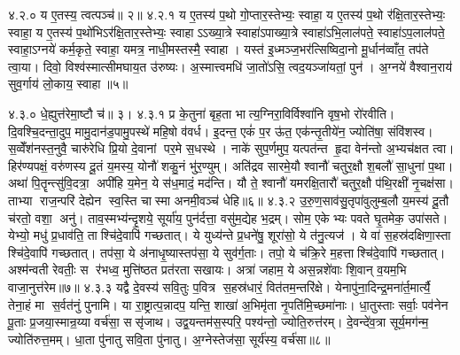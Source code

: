 ४.२.०
य ए॒तस्य॒ त्वत्पञ्च॑॥ २॥
४.२.१
य ए॒तस्य॑ प॒थो गो॒प्तार॒स्तेभ्यः॒ स्वाहा॒ य ए॒तस्य॑ प॒थो र॑क्षि॒तार॒स्तेभ्यः॒ स्वाहा॒ य ए॒तस्य॑ प॒थो॑भिऽर॑क्षि॒तार॒स्तेभ्यः॒ स्वाहाऽऽख्या॒त्रे स्वाहा॑ऽपाख्या॒त्रे स्वाहा॑ऽभि॒लाल॑पते॒ स्वाहा॑ऽप॒लाल॑पते॒ स्वाहा॒ऽग्नये॑ कर्म॒कृते॒ स्वाहा॒ यमत्र॒ नाधी॒मस्तस्मै॒ स्वाहा। यस्त॑ इ॒ध्मञ्ज॒भर॑त्सिष्विदा॒नो मू॒र्धान॑व्वाँत॒ तप॑ते त्वा॒या। दिवो॒ विश्व॑स्मात्सीमघाय॒त उ॑रुष्यः। अ॒स्मात्त्वमधि॑ जा॒तो॑ऽसि॒ त्वद॒यञ्जा॑यतां॒ पुन॑। अ॒ग्नये॑ वैश्वान॒राय॑ सुव॒र्गाय॑ लो॒काय॒ स्वाहा॥५॥
\anuvakamend

४.३.०
धे॒ह्युत्त॑रेमा॒ष्टौ च॑॥ ३।
४.३.१
प्र के॒तुना॑ बृह॒ता भात्य॒ग्निरा॒विर्विश्वा॑नि वृष॒भो रो॑रवीति। दि॒वश्चि॒दन्ता॒दुप॒ मामु॒दान॑ड॒पामु॒पस्थे॑ महि॒षो व॑वर्ध। इ॒दन्त॒ एकं॑ प॒र ऊ॑त॒ एक॑न्तृ॒तीये॑न॒ ज्योति॑षा॒ संवि॑शस्व। स॒व्वेँश॑नस्त॒नुवै॒ चारु॑रेधि प्रि॒यो दे॒वानां पर॒मे स॒धस्थे। नाके॑ सुप॒र्णमुप॒ यत्पत॑न्त हृ॒दा वेन॑न्तो अ॒भ्यच॑क्षत त्वा। हिर॑ण्यपक्षं॒ वरु॑णस्य दू॒तं य॒मस्य॒ योनौ॑ शकु॒नं भु॑र॒ण्युम्। अति॑द्रव सारमे॒यौ श्वानौ॑ चतुर॒क्षौ श॒बलौ॑ सा॒धुना॑ प॒था। अथा॑ पि॒तॄन्त्सु॑वि॒दत्रा॒ अपी॑हि य॒मेन॒ ये स॑ध॒मादं॒ मद॑न्ति। यौ ते॒ श्वानौ॑ यमरक्षि॒तारौ॑ चतुर॒क्षौ प॑थि॒रक्षी॑ नृ॒चक्ष॑सा। ताभ्या राज॒न्परि॑ देह्येन स्व॒स्ति चास्मा अनमी॒वञ्च॑ धेहि॥६॥
४.३.२
उ॒रु॒ण॒साव॑सु॒तृपा॑वुलुम्ब॒लौ य॒मस्य॑ दू॒तौ च॑रतो॒ वशा॒ अनु॑। ताव॒स्मभ्य॑न्दृ॒शये॒ सूर्या॑य॒ पुन॑र्दत्ता॒ वसु॑म॒द्येह भ॒द्रम्। सोम॒ एकेभ्यः पवते घृ॒तमेक॒ उपा॑सते। येभ्यो॒ मधु॑ प्र॒धाव॑ति॒ ताश्चि॑दे॒वापि॑ गच्छतात्। ये युध्य॑न्ते प्र॒धने॑षु॒ शूरा॑सो॒ ये त॑नु॒त्यज॑। ये वा॑ स॒हस्र॑दक्षिणा॒स्ता श्चि॑दे॒वापि॑ गच्छतात्। तप॑सा॒ ये अ॑नाधृ॒ष्यास्तप॑सा॒ ये सुव॑र्ग॒ताः। तपो॒ ये च॑क्रि॒रे म॒हत्ताश्चि॑दे॒वापि॑ गच्छतात्। अश्म॑न्वती रेवतीः॒ स र॑भध्व॒ मुत्ति॑ष्ठत प्रत॑रता सखायः। अत्रा॑ जहाम॒ ये अस॒न्नशे॑वाः  शि॒वान् व॒यम॒भि वाजा॒नुत्त॑रेम॥७॥
४.३.३
यद्वै दे॒वस्य॑ सवि॒तुः प॒वित्र स॒हस्र॑धारं॒  वित॑तम॒न्तरि॑क्षे। येनापु॑ना॒दिन्द्र॒मना॑र्त॒मार्त्यै॒ तेना॒हं मा स॒र्वत॑नुं पुनामि। या रा॒ष्ट्रात्प॒न्नादप॒ यन्ति॒ शाखा॑ अ॒भिमृ॑ता नृ॒पति॑मि॒च्छमा॑नाः। धा॒तुस्ताः सर्वाः॒ पव॑नेन पू॒ताः प्र॒जया॒स्मान्र॒य्या वर्च॑सा॒ ससृ॑जाथ। उद्व॒यन्तम॑स॒स्परि॒ पश्य॑न्तो॒ ज्योति॒रुत्त॑रम्। दे॒वन्दे॑व॒त्रा सूर्य॒मग॑न्म॒ ज्योति॑रुत्त॒मम्। धा॒ता पु॑नातु सवि॒ता पु॑नातु। अ॒ग्नेस्तेज॑सा॒ सूर्य॑स्य॒ वर्च॑सा॥८॥
\anuvakamend

